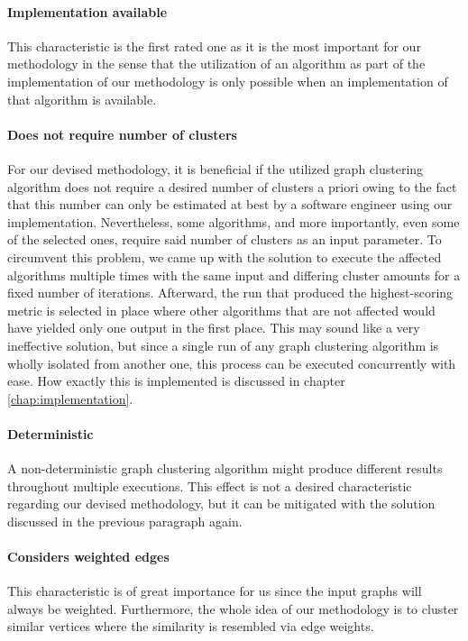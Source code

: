 \documentclass[12pt,a4paper]{report}
\begin{document}
\paragraph{Implementation available}
This characteristic is the first rated one
as it is the most important for our methodology in the sense that the
utilization of an algorithm as part of the implementation of our methodology is
only possible when an implementation of that algorithm is available.

\paragraph{Does not require number of clusters} \label{graph-clustering-algorithm-survey-amount-of-clusters}
For our devised methodology, it is
beneficial if the utilized graph clustering algorithm does not require a
desired number of clusters a priori owing to the fact that this number can only
be estimated at best by a software engineer using our implementation.
Nevertheless, some algorithms, and more importantly, even some of the selected
ones, require said number of clusters as an input parameter. To circumvent this
problem, we came up with the solution to execute the affected algorithms
multiple times with the same input and differing cluster amounts for a fixed
number of iterations. Afterward, the run that produced the highest-scoring
metric is selected in place where other algorithms that are not affected would
have yielded only one output in the first place. This may sound like a very
ineffective solution, but since a single run of any graph clustering algorithm
is wholly isolated from another one, this process can be executed concurrently
with ease. How exactly this is implemented is discussed in chapter
\ref{chap:implementation}.

\paragraph{Deterministic}
A non\hyp deterministic graph clustering algorithm
might produce different results throughout multiple executions. This effect is
not a desired characteristic regarding our devised methodology, but it can be
mitigated with the solution discussed in the previous paragraph again.

\paragraph{Considers weighted edges}
This characteristic is of great importance
for us since the input graphs will always be weighted. Furthermore, the whole
idea of our methodology is to cluster similar vertices where the similarity is
resembled via edge weights.
\end{document}
